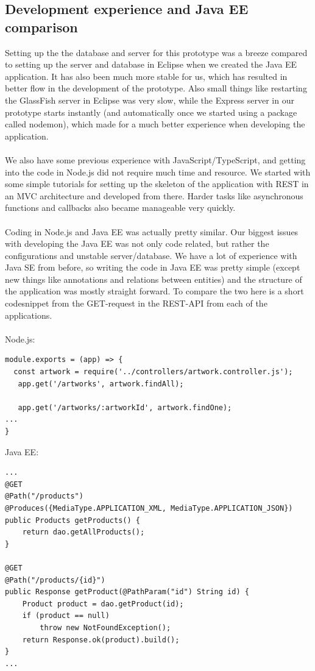 \subsection{Development experience and Java EE comparison}
Setting up the the database and server for this prototype was a breeze compared to setting up the server and database in Eclipse when we created the Java EE application. It has also been much more stable for us, which has resulted in better flow in the development of the prototype. Also small things like restarting the GlassFish server in Eclipse was very slow, while the Express server in our prototype starts instantly (and automatically once we started using a package called nodemon), which made for a much better experience when developing the application.
\\\\
We also have some previous experience with JavaScript/TypeScript, and getting into the code in Node.js did not require much time and resource. We started with some simple tutorials for setting up the skeleton of the application with REST in an MVC architecture and developed from there. Harder tasks like asynchronous functions and callbacks also became manageable very quickly.
\\\\
Coding in Node.js and Java EE was actually pretty similar. Our biggest issues with developing the Java EE was not only code related, but rather the configurations and unstable server/database. We have a lot of experience with Java SE from before, so writing the code in Java EE was pretty simple (except new things like annotations and relations between entities) and the structure of the application was mostly straight forward. To compare the two here is a short codesnippet from the GET-request in the REST-API from each of the applications.
\\\\
Node.js:
\begin{verbatim}
module.exports = (app) => {
  const artwork = require('../controllers/artwork.controller.js');
   app.get('/artworks', artwork.findAll);
   
   app.get('/artworks/:artworkId', artwork.findOne);
...
}
\end{verbatim}
Java EE:
\begin{verbatim}
...
@GET
@Path("/products")
@Produces({MediaType.APPLICATION_XML, MediaType.APPLICATION_JSON})
public Products getProducts() {
	return dao.getAllProducts();
}

@GET
@Path("/products/{id}")
public Response getProduct(@PathParam("id") String id) {
	Product product = dao.getProduct(id);
	if (product == null)
		throw new NotFoundException();
	return Response.ok(product).build();
}
...
\end{verbatim}
